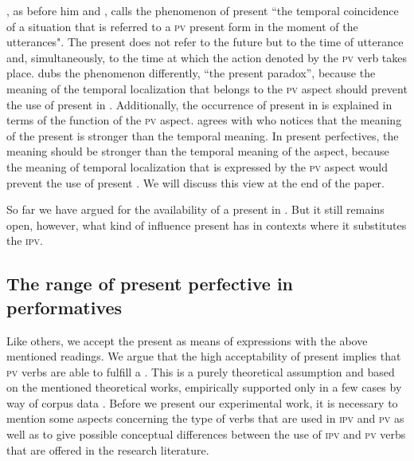 \documentclass[output=paper,colorlinks,citecolor=brown,newtxmath,hidelinks]{langscibook}
\begin{document}
\citet{Dickey2000}, as before him \citet{Bondarko1971} and \citet{Galton1976}, calls the phenomenon of present  “the temporal coincidence of a situation that is referred to a \textsc{pv} present form in the moment of the utterances". The present  does not refer to the future but to the time of utterance and, simultaneously, to the time at which the action denoted by the \textsc{pv} verb takes place. \citet{Dewit2017} dubs the phenomenon differently, “the present  paradox”, because the meaning of the temporal localization that belongs to the \textsc{pv} aspect should prevent the use of present  in . Additionally, the occurrence of present  in  is explained in terms of the  function of the \textsc{pv} aspect. \citet{Dewit2017} agrees with \citet{Breu2000ProblemederInteraktion} who notices that the  meaning of the present  is stronger than the temporal meaning. In present perfectives, the  meaning should be stronger than the temporal meaning of the aspect, because the meaning of temporal localization that is expressed by the \textsc{pv} aspect would prevent the use of present . We will discuss this view at the end of the paper. 

So far we have argued for the availability of a present  in . But it still remains open, however, what kind of influence  present has in contexts where it substitutes the \textsc{ipv}. 

\subsection{The range of present perfective in performatives}\label{sub:eins:5}

Like others, we accept the present  as means of expressions with the above mentioned readings. We argue that the high acceptability of present  implies that \textsc{pv}  verbs are able to fulfill a . This is a purely theoretical assumption and based on the mentioned theoretical works, empirically supported only in a few cases by way of corpus data \citep{Laczinski2014,Wiemer2014}. Before we  present our experimental work, it is necessary to mention some aspects concerning the type of  verbs that are used in \textsc{ipv} and \textsc{pv} as well as to give possible conceptual differences between the use of \textsc{ipv} and \textsc{pv}  verbs that are offered in the research literature.
\end{document}
